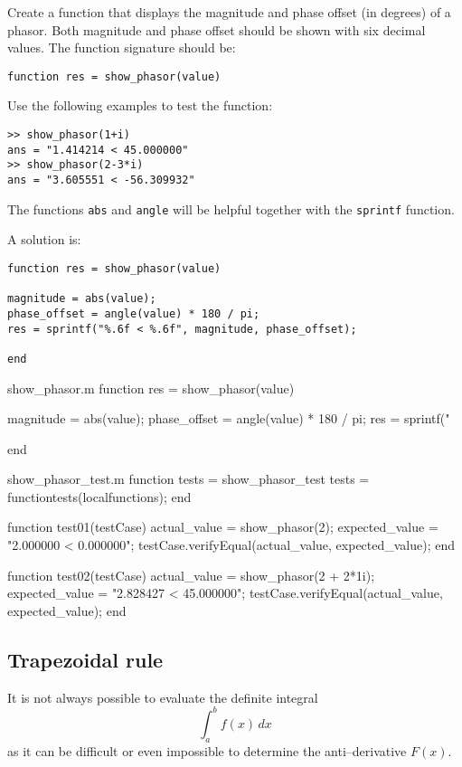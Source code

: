 \begin{ex}
Create a function that displays the magnitude and 
phase offset (in degrees) of a phasor.
Both magnitude and phase offset should be shown with six 
decimal values.
The function signature should be:
\begin{lstlisting}
function res = show_phasor(value)
\end{lstlisting}
Use the following examples to test the function:
\begin{lstlisting}
>> show_phasor(1+i)
ans = "1.414214 < 45.000000"
>> show_phasor(2-3*i)
ans = "3.605551 < -56.309932"
\end{lstlisting}
\begin{hint}
The functions \verb!abs! and \verb!angle! will be helpful together with the \verb!sprintf! function.
\end{hint}
\begin{sol}
A solution is:
\begin{lstlisting}
function res = show_phasor(value)

magnitude = abs(value);
phase_offset = angle(value) * 180 / pi;
res = sprintf("%.6f < %.6f", magnitude, phase_offset);

end
\end{lstlisting}
\end{sol}
\begin{solutionfile}{show_phasor.m}
function res = show_phasor(value)

magnitude = abs(value);
phase_offset = angle(value) * 180 / pi;
res = sprintf("%

end
\end{solutionfile}
\begin{solutionfile}{show_phasor_test.m}
function tests = show_phasor_test
    tests = functiontests(localfunctions);
end


function test01(testCase)
    actual_value = show_phasor(2);
    expected_value = "2.000000 < 0.000000";
    testCase.verifyEqual(actual_value, expected_value);
end

function test02(testCase)
    actual_value = show_phasor(2 + 2*1i);
    expected_value = "2.828427 < 45.000000";
    testCase.verifyEqual(actual_value, expected_value);
end
\end{solutionfile}
\end{ex}



\subsection{Trapezoidal rule}
It is not always possible to evaluate the definite integral
\[
\int_a^b f(x) \, dx
\]
as it can be difficult or even impossible to determine the 
anti--derivative $F(x)$.


